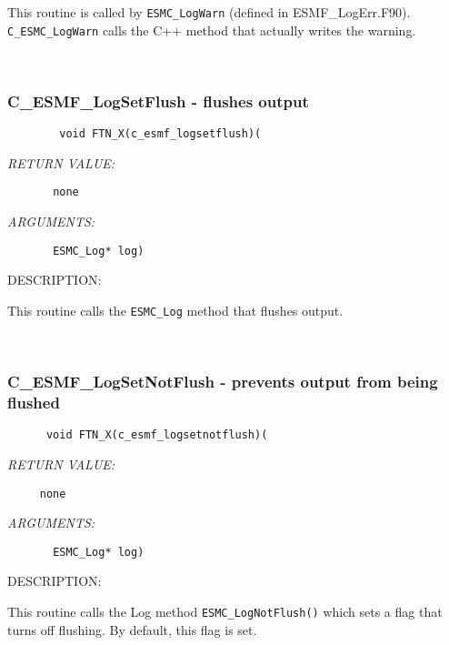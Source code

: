       This routine is called by {\tt ESMC\_LogWarn} (defined in ESMF\_LogErr.F90).  
      {\tt C\_ESMC\_LogWarn} calls the C++ method that actually writes the warning.
   
 
\mbox{}\hrulefill\ 
 
\subsubsection [C\_ESMF\_LogSetFlush] {C\_ESMF\_LogSetFlush - flushes output}


  
\begin{verbatim}        void FTN_X(c_esmf_logsetflush)(\end{verbatim}{\em RETURN VALUE:}
\begin{verbatim}       none\end{verbatim}{\em ARGUMENTS:}
\begin{verbatim}    
       ESMC_Log* log)\end{verbatim}
{\sf DESCRIPTION:\\ }


    This routine calls the {\tt ESMC\_Log} method that flushes output.
   
 
\mbox{}\hrulefill\ 
 
\subsubsection [C\_ESMF\_LogSetNotFlush] {C\_ESMF\_LogSetNotFlush - prevents output from being flushed}


  
\begin{verbatim}      void FTN_X(c_esmf_logsetnotflush)(\end{verbatim}{\em RETURN VALUE:}
\begin{verbatim}     none\end{verbatim}{\em ARGUMENTS:}
\begin{verbatim}       ESMC_Log* log)
 \end{verbatim}
{\sf DESCRIPTION:\\ }


      This routine calls the Log method {\tt ESMC\_LogNotFlush()} which sets a flag
      that turns off flushing. By default, this flag is set.
   

